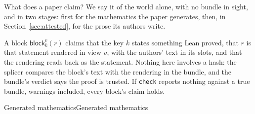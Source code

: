 \documentclass[acmsmall,screen,review,anonymous,nonacm]{acmart}
\begin{document}
What does a paper claim? We say it of the world alone, with no bundle in
sight, and in two stages: first for the mathematics the paper generates,
then, in Section~\ref{sec:attested}, for the prose its authors write.

A block $\mathsf{block}_{k}^{v}(r)$ claims that the key $k$ states something
Lean proved, that $r$ is that statement rendered in view $v$, with the
authors' text in its slots, and that the rendering reads back as the
statement. Nothing here involves a hash:
the splicer compares the block's text with the rendering in the bundle,
and the bundle's verdict says the proof is trusted. If \verb|check| reports
nothing against a true bundle, warnings included, every block's claim
holds.

\begin{leantheorem}[sum=g6Fxb8r-Rw]{Generated mathematics}{Generated mathematics}
\label{thm:Generated-mathematics}
\end{leantheorem}
\end{document}
